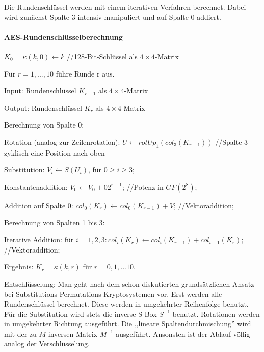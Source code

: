 \documentclass[a4paper]{article}
\begin{document}
\begin{multicols}{3}
    Die Rundenschlüssel werden mit einem iterativen Verfahren berechnet. Dabei wird zunächst Spalte 3 intensiv manipuliert und auf Spalte 0 addiert.

    \paragraph{AES-Rundenschlüsselberechnung}
    $K_0 =\kappa (k,0)\leftarrow k$ //128-Bit-Schlüssel als $4\times 4$-Matrix

    Für $r= 1,..., 10$ führe Runde r aus.
    \begin{itemize*}
        \item Input: Rundenschlüssel $K_{r-1}$ als $4\times 4$-Matrix
        \item Output: Rundenschlüssel $K_r$ als $4\times 4$-Matrix
        \item Berechnung von Spalte 0:
        \begin{enumerate*}
            \item Rotation (analog zur Zeilenrotation): $U\leftarrow rotUp_1(col_3(K_{r-1}))$ //Spalte 3 zyklisch eine Position nach oben
            \item Substitution: $V_i\leftarrow S(U_i)$, für $0\geq i\geq 3$;
            \item Konstantenaddition: $V_0\leftarrow V_0+02^{r-1}$; //Potenz in $GF(2^8)$;
            \item Addition auf Spalte 0: $col_0(K_r)\leftarrow col_0(K_{r-1})+V$; //Vektoraddition;
        \end{enumerate*}
        \item Berechnung von Spalten 1 bis 3:
        \item Iterative Addition: für $i=1,2,3: col_i(K_r)\leftarrow col_i(K_{r-1})+col_{i-1}(K_r)$; //Vektoraddition;
        \item Ergebnis: $K_r=\kappa (k,r)$ für $r=0,1,...10$.
    \end{itemize*}

    Entschlüsselung:
    Man geht nach dem schon diskutierten grundsätzlichen Ansatz bei Substitutions-Permutations-Kryptosystemen vor. Erst werden alle Rundenschlüssel berechnet. Diese werden in umgekehrter Reihenfolge benutzt. Für die Substitution wird stets die inverse S-Box $S^{-1}$ benutzt. Rotationen werden in umgekehrter Richtung ausgeführt. Die ,,lineare Spaltendurchmischung'' wird mit der zu $M$ inversen Matrix $M^{-1}$ ausgeführt. Ansonsten ist der Ablauf völlig analog der Verschlüsselung.


\end{multicols}
\end{document}
